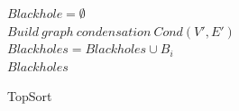 \documentclass[12pt,a4paper,oneside]{article}
\theoremstyle{definition}
\theoremstyle{lemma}
\theoremstyle{remark}
\begin{document}
\begin{figure}[H]
	\begin{center}
		\begin{algorithm}[H]
			\SetAlgoLined

                        $Blackhole = \emptyset$\\
                        $Build\ graph\ condensation\ Cond(V',E')$\\
                         {
                             {
                                 {
                                     {
                                        $Blackholes = Blackholes \cup B_i$ \\
                                    }
                                }
                            }
                        }
                        \Return $Blackholes$
			\label{alg:topsort}
			\caption{TopSort}
		\end{algorithm}
	\end{center}
\end{figure}
\end{document}
